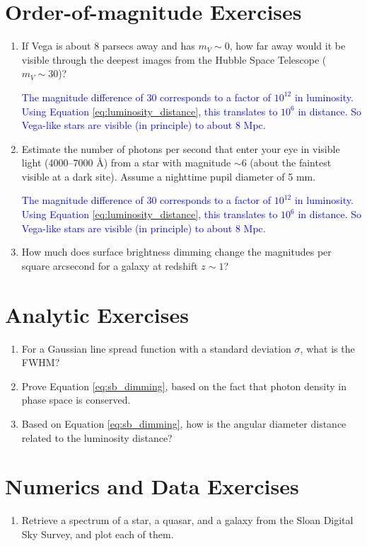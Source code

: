 \section{Order-of-magnitude Exercises}

\begin{enumerate} 
\item If Vega is about 8 parsecs away and has $m_V \sim 0$, how far
  away would it be visible through the deepest images from the Hubble
  Space Telescope ($m_V\sim 30$)?

  \ifanswers \textcolor{blue}{ The magnitude difference of 30
    corresponds to a factor of $10^{12}$ in luminosity. Using Equation
    \ref{eq:luminosity_distance}, this translates to $10^6$ in
    distance. So Vega-like stars are visible (in principle) to about 8
    Mpc.  }
  \fi

\item Estimate the number of photons per second that enter your eye in
  visible light (4000--7000 \AA) from a star with magnitude $\sim 6$
  (about the faintest visible at a dark site). Assume a nighttime
  pupil diameter of 5 mm. 

  \ifanswers \textcolor{blue}{ The magnitude difference of 30
    corresponds to a factor of $10^{12}$ in luminosity. Using Equation
    \ref{eq:luminosity_distance}, this translates to $10^6$ in
    distance. So Vega-like stars are visible (in principle) to about 8
    Mpc.  }
  \fi

\item How much does surface brightness dimming change the magnitudes
  per square arcsecond for a galaxy at redshift $z\sim 1$?
\end{enumerate}   

\section{Analytic Exercises}

\begin{enumerate}
\item For a Gaussian line spread function with a standard deviation
  $\sigma$, what is the FWHM?
\item Prove Equation \ref{eq:sb_dimming}, based on the fact that
  photon density in phase space is conserved.
\item Based on Equation \ref{eq:sb_dimming}, how is the angular
  diameter distance related to the luminosity distance? 
\end{enumerate}

\section{Numerics and Data Exercises}

\begin{enumerate}
\item Retrieve a spectrum of a star, a quasar, and a galaxy from the
  Sloan Digital Sky Survey, and plot each of them. 
\end{enumerate}


  
